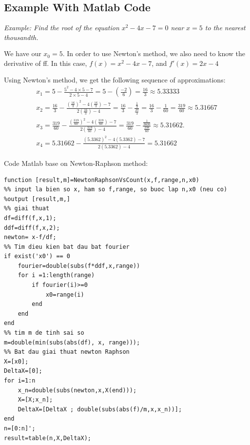 \subsection{Example With Matlab Code}
\label{Example2}
\vspace{0.38cm} \textit{Example: Find the root of the equation $x^2 - 4x - 7 = 0 $ near $x = 5$ to the nearest thousandth.}

We have our $x_0 = 5 $. In order to use Newton's method, we also need to know the derivative of ff. In this case, $f(x) = x^2 - 4x - 7$, and $f'(x) = 2x - 4$

Using Newton's method, we get the following sequence of approximations:
\begin{equation*}
    \begin{gathered}
{x_1} = 5 - \frac{{{5^2} - 4 \times 5 - 7}}{{2 \times 5 - 4}} = 5 - \left( {\frac{{ - 2}}{6}} \right) = \frac{{16}}{3} \approx 5.33333\\
{x_2} = \frac{{16}}{3} - \frac{{{{\left( {\frac{{16}}{3}} \right)}^2} - 4\left( {\frac{{16}}{3}} \right) - 7}}{{2\left( {\frac{{16}}{3}} \right) - 4}} = \frac{{16}}{3} - \frac{{\frac{1}{9}}}{{\frac{{20}}{3}}} = \frac{{16}}{3} - \frac{1}{{60}} = \frac{{319}}{{60}} \approx 5.31667\\
{x_3} = \frac{{319}}{{60}} - \frac{{{{\left( {\frac{{319}}{{60}}} \right)}^2} - 4\left( {\frac{{319}}{{60}}} \right) - 7}}{{2\left( {\frac{{319}}{{60}}} \right) - 4}} = \frac{{319}}{{60}} - \frac{{\frac{1}{{3600}}}}{{\frac{{398}}{{60}}}} \approx 5.31662.\\
{x_4} = 5.31662 - \frac{{{{(5.3362)}^2} - 4(5.3362) - 7}}{{2(5.3362) - 4}} = 5.31662
\end{gathered}
\end{equation*}

Code Matlab base on Newton-Raphson method:
\begin{lstlisting}
function [result,m]=NewtonRaphsonVsCount(x,f,range,n,x0)
%% input la bien so x, ham so f,range, so buoc lap n,x0 (neu co)
%output [result,m,]
%% giai thuat
df=diff(f,x,1);
ddf=diff(f,x,2);
newton= x-f/df;
%% Tim dieu kien bat dau bat fourier 
if exist('x0') == 0
    fourier=double(subs(f*ddf,x,range))
    for i =1:length(range)
        if fourier(i)>=0
            x0=range(i)
        end                             
    end
end
%% tim m de tinh sai so 
m=double(min(subs(abs(df), x, range)));
%% Bat dau giai thuat newton Raphson
X=[x0];
DeltaX=[0];
for i=1:n
    x_n=double(subs(newton,x,X(end)));
    X=[X;x_n];
    DeltaX=[DeltaX ; double(subs(abs(f)/m,x,x_n))];
end
n=[0:n]';
result=table(n,X,DeltaX);

\end{lstlisting}

